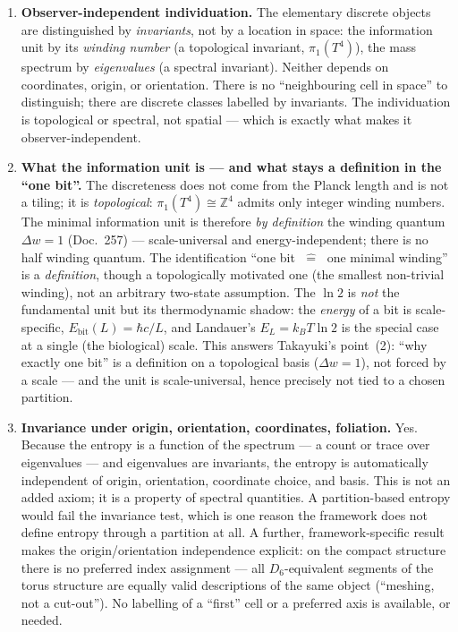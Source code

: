 \begin{enumerate}
\item \textbf{Observer-independent individuation.} The elementary discrete objects are
distinguished by \emph{invariants}, not by a location in space: the information unit by
its \emph{winding number} (a topological invariant, $\pi_1(T^4)$), the mass spectrum by
\emph{eigenvalues} (a spectral invariant). Neither depends on coordinates, origin, or
orientation. There is no \enquote{neighbouring cell in space} to distinguish; there are
discrete classes labelled by invariants. The individuation is topological or spectral,
not spatial --- which is exactly what makes it observer-independent.

\item \textbf{What the information unit is --- and what stays a definition in the
\enquote{one bit}.} The discreteness does not come from the Planck length and is not a
tiling; it is \emph{topological}: $\pi_1(T^4) \cong \mathbb{Z}^4$ admits only integer
winding numbers. The minimal information unit is therefore \emph{by definition} the
winding quantum $\Delta w = 1$ (Doc.~257) --- scale-universal and energy-independent;
there is no half winding quantum. The identification \enquote{one bit
$\;\widehat{=}\;$ one minimal winding} is a \emph{definition}, though a topologically
motivated one (the smallest non-trivial winding), not an arbitrary two-state
assumption. The $\ln 2$ is \emph{not} the fundamental unit but its thermodynamic
shadow: the \emph{energy} of a bit is scale-specific, $E_\text{bit}(L) = \hbar c / L$,
and Landauer's $E_L = k_B T \ln 2$ is the special case at a single (the biological)
scale. This answers Takayuki's point~(2): \enquote{why exactly one bit} is a definition
on a topological basis ($\Delta w = 1$), not forced by a scale --- and the unit is
scale-universal, hence precisely not tied to a chosen partition.

\item \textbf{Invariance under origin, orientation, coordinates, foliation.} Yes.
Because the entropy is a function of the spectrum --- a count or trace over eigenvalues
--- and eigenvalues are invariants, the entropy is automatically independent of origin,
orientation, coordinate choice, and basis. This is not an added axiom; it is a
property of spectral quantities. A partition-based entropy would fail the invariance
test, which is one reason the framework does not define entropy through a partition at
all. A further, framework-specific result makes the origin/orientation independence
explicit: on the compact structure there is no preferred index assignment --- all
$D_6$-equivalent segments of the torus structure are equally valid descriptions of the
same object (\enquote{meshing, not a cut-out}). No labelling of a \enquote{first} cell
or a preferred axis is available, or needed.


\end{enumerate}
